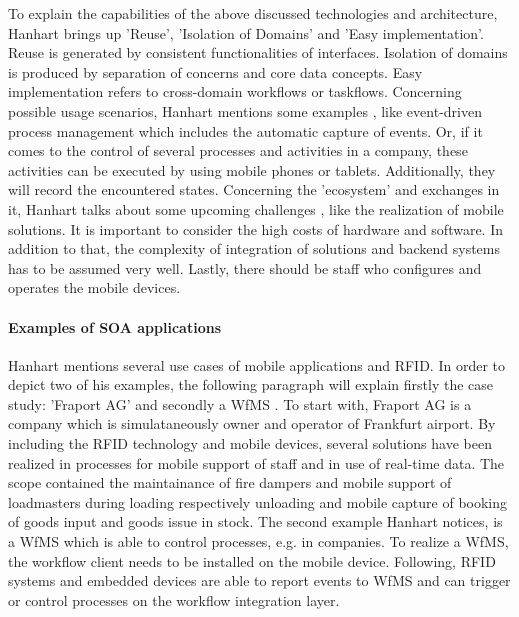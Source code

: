 To explain the capabilities of the above discussed technologies and architecture, Hanhart brings up 'Reuse', 'Isolation of Domains' and 'Easy implementation'. Reuse is generated by consistent functionalities of interfaces. Isolation of domains is produced by separation of concerns and core data concepts. Easy implementation refers to cross-domain workflows or taskflows. Concerning possible usage scenarios, Hanhart mentions some examples \cite[p.207 ff.]{mobile}, like event-driven process management which includes the automatic capture of events. Or, if it comes to the control of several processes and activities in a company, these activities can be executed by using mobile phones or tablets. Additionally, they will record the encountered states.
Concerning the 'ecosystem' and exchanges in it, Hanhart talks about some upcoming challenges \cite[p.212 ff.]{mobile}, like the realization of mobile solutions. It is important to consider the high costs of hardware and software. In addition to that, the complexity of integration of solutions and backend systems has to be assumed very well. Lastly, there should be staff who configures and operates the mobile devices.  

\paragraph{Examples of SOA applications}

Hanhart mentions several use cases of mobile applications and RFID. In order to depict two of his examples, the following paragraph will explain firstly the case study: 'Fraport AG' \cite[p.39 ff.]{mobile} and secondly a \ac{WfMS} \cite[p.204 ff.]{mobile}. To start with, Fraport AG is a company which is simulataneously owner and operator of Frankfurt airport. By including the RFID technology and mobile devices, several solutions have been realized in processes for mobile support of staff and in use of real-time data. The scope contained the maintainance of fire dampers and mobile support of loadmasters during loading respectively unloading and mobile capture of booking of goods input and goods issue in stock. 
The second example Hanhart notices, is a WfMS \cite[p.204 ff.]{mobile} which is able to control processes, e.g. in companies. To realize a WfMS, the workflow client needs to be installed on the mobile device. Following, RFID systems and embedded devices are able to report events to WfMS and can trigger or control processes on the workflow integration layer.
     
